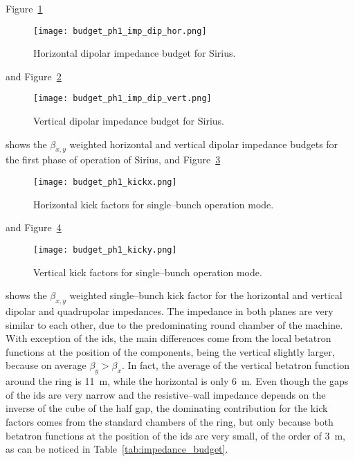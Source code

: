     Figure~\ref{fig:dipolar_hor_imp_budget}
    \begin{figure}
        \centering
        \texttt{[image: budget\_ph1\_imp\_dip\_hor.png]}
        \caption{Horizontal dipolar impedance budget for Sirius.}
        \label{fig:dipolar_hor_imp_budget}
    \end{figure}
    and Figure~\ref{fig:dipolar_vert_imp_budget}
    \begin{figure}
        \centering
        \texttt{[image: budget\_ph1\_imp\_dip\_vert.png]}
        \caption{Vertical dipolar impedance budget for Sirius.}
        \label{fig:dipolar_vert_imp_budget}
    \end{figure}
    shows the $\beta_{x,y}$ weighted horizontal and vertical dipolar impedance budgets for the first phase of operation of Sirius, and Figure~\ref{fig:ph1_kickx}
    \begin{figure}
        \centering
        \texttt{[image: budget\_ph1\_kickx.png]}
        \caption{Horizontal kick factors for single--bunch operation mode.}
        \label{fig:ph1_kickx}
    \end{figure}
    and Figure~\ref{fig:ph1_kicky}
    \begin{figure}
        \centering
        \texttt{[image: budget\_ph1\_kicky.png]}
        \caption{Vertical kick factors for single--bunch operation mode.}
        \label{fig:ph1_kicky}
    \end{figure}
    shows the $\beta_{x,y}$ weighted single--bunch kick factor for the horizontal and vertical dipolar and quadrupolar impedances. The impedance in both planes are very similar to each other, due to the predominating round chamber of the machine. With exception of the \glspl{id}, the main differences come from the local betatron functions at the position of the components, being the vertical slightly larger, because on average $\beta_y > \beta_x$. In fact, the average of the vertical betatron function around the ring is \SI{11}{\meter}, while the horizontal is only \SI{6}{\meter}. Even though the gaps of the \glspl{id} are  very narrow and the resistive--wall impedance depends on the inverse of the cube of the half gap, the dominating contribution for the kick factors comes from the standard chambers of the ring, but only because both betatron functions at the position of the \glspl{id} are very small, of the order of \SI{3}{\meter}, as can be noticed in Table~\ref{tab:impedance_budget}.

